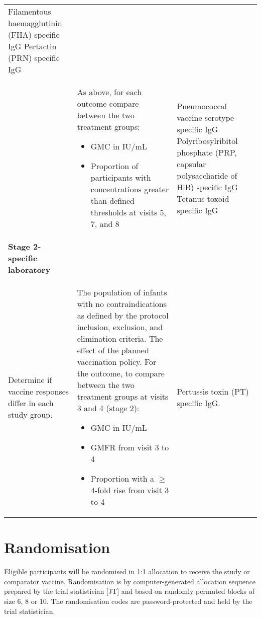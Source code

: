 \documentclass{bmcart}
\begin{document}
\begin{table}[h!]
\begin{tabular}{p{4cm}p{4cm}p{4cm}}
		Filamentous haemagglutinin (FHA) specific IgG\newline 
		Pertactin (PRN) specific IgG
		\\
		& 		
		As above, for each outcome compare between the two treatment groups: 
		\begin{itemize}
			\item GMC in IU/mL
			\item Proportion of participants with concentrations greater than defined thresholds at visits 5, 7, and 8
		\end{itemize} &
		Pneumococcal vaccine serotype specific IgG\newline 
		Polyribosylribitol phosphate (PRP, capsular polysaccharide of HiB) specific IgG\newline 
		Tetanus toxoid specific IgG
		\\
		\textbf{Stage 2-specific laboratory} & &  \\
		Determine if vaccine responses differ in each study group. &
		The population of infants with no contraindications as defined by the protocol inclusion, exclusion, and elimination criteria. \newline 
		The effect of the planned vaccination policy.\newline
		For the outcome, to compare between the two treatment groups at visits 3 and 4 (stage 2):
		\begin{itemize} 
			\item GMC in IU/mL
			\item GMFR from visit 3 to 4
			\item Proportion with a $\geq$4-fold rise from visit 3 to 4
		\end{itemize} &
		Pertussis toxin (PT) specific IgG.
		\\
		\hline
		\hline
	\end{tabular}
\end{table}


\section*{Randomisation}

Eligible participants will be randomised in 1:1 allocation to receive the study or comparator vaccine.
Randomisation is by computer-generated allocation sequence prepared by the trial statistician [JT] and based on randomly permuted blocks of size 6, 8 or 10.
The randomisation codes are password-protected and held by the trial statistician.
\end{document}
